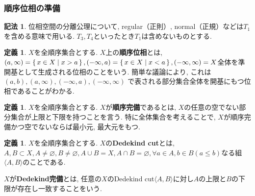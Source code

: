 \documentclass[a4paper, twoside]{bxjsarticle}
\theoremstyle{definition}
\newtheorem{defn}[thm]{定義}
\newtheorem{notation}[thm]{記法}
\begin{document}
    \subsubsection{順序位相の準備}
        \begin{notation}
            位相空間の分離公理について, regular（正則）, normal（正規）などは$T_1$を含める意味で用いる. $T_3, T_4$といったとき$T_1$は含めないものとする.
        \end{notation}
        \begin{defn}
            $X$を全順序集合とする. $X$上の\textbf{順序位相}とは, $(a, \infty) = \set{x\in X|x>a}, (-\infty, a)=\set{x\in X|x<a}, (-\infty, \infty)=X$全体を準開基として生成される位相のことをいう. 簡単な議論により, これは$(a, b), (a, \infty), (-\infty, a), (-\infty, \infty)$ で表される部分集合全体を開基にもつ位相であることがわかる.
        \end{defn}
        \begin{defn}
            $X$を全順序集合とする. $X$が\textbf{順序完備}であるとは, $X$の任意の空でない部分集合が上限と下限を持つことを言う. 特に全体集合を考えることで, $X$が順序完備かつ空でないならば最小元, 最大元をもつ.
        \end{defn}
        \begin{defn}
            $X$を全順序集合とする. $X$の\textbf{Dedekind cut}とは, $A, B\subset X, A\neq \varnothing, B\neq\varnothing, A\cup B = X, A\cap B=\varnothing, \forall a\in A, b\in B(a\leq b)$なる組$\langle A, B\rangle$のことである.
            
            $X$が\textbf{Dedekind完備}とは, 任意の$X$のDedekind cut$\langle A, B\rangle$に対し$A$の上限と$B$の下限が存在し一致することをいう.
        \end{defn}
\end{document}
